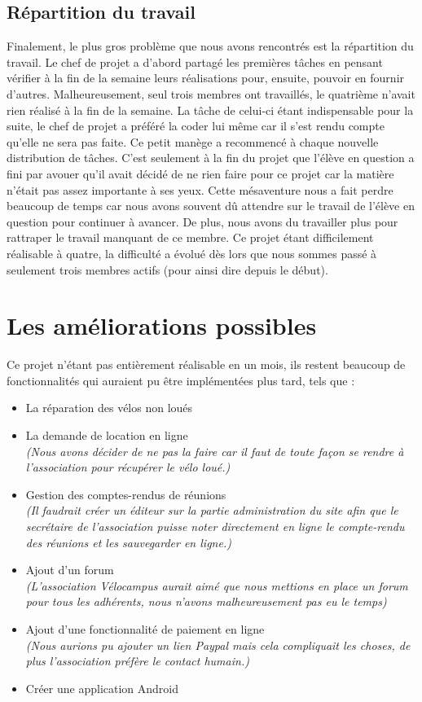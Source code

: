 \documentclass[11pt,a4paper,titlepage]{report}
\begin{document}
\section{Répartition du travail}
Finalement, le plus gros problème que nous avons rencontrés est la répartition du travail. 
Le chef de projet a d'abord partagé les premières tâches en pensant vérifier à la fin de la semaine leurs réalisations pour, ensuite, pouvoir en fournir d'autres. Malheureusement, seul trois membres ont travaillés, le quatrième n'avait rien réalisé à la fin de la semaine. 
La tâche de celui-ci étant indispensable pour la suite, le chef de projet a préféré la coder lui même car il s'est rendu compte qu'elle ne sera pas faite.
Ce petit manège a recommencé à chaque nouvelle distribution de tâches. C'est seulement à la fin du projet que l'élève en question a fini par avouer qu'il avait décidé de ne rien faire pour ce projet car la matière n'était pas assez importante à ses yeux. Cette mésaventure nous a fait perdre beaucoup de temps car nous avons souvent dû attendre sur le travail de l'élève en question pour continuer à avancer. De plus, nous avons du travailler plus pour rattraper le travail manquant de ce membre.
Ce projet étant difficilement réalisable à quatre, la difficulté a évolué dès lors que nous sommes passé à seulement trois membres actifs (pour ainsi dire depuis le début). 
\chapter{Les améliorations possibles}
Ce projet n'étant pas entièrement réalisable en un mois, ils restent beaucoup de fonctionnalités qui auraient pu être implémentées plus tard, tels que : \\
\begin{itemize}
\item La réparation des vélos non loués 
\item La demande de location en ligne \\
\textit{(Nous avons décider de ne pas la faire car il faut de toute façon se rendre à l'association pour récupérer le vélo loué.)}
\item Gestion des comptes-rendus de réunions\\ \textit{(Il faudrait créer un éditeur sur la partie administration du site afin que le secrétaire de l'association puisse noter directement en ligne le compte-rendu des réunions et les sauvegarder en ligne.)} 
\item Ajout d'un forum \\
\textit{(L'association Vélocampus aurait aimé que nous mettions en place un forum pour tous les adhérents, nous n'avons malheureusement pas eu le temps)} 
\item Ajout d'une fonctionnalité de paiement en ligne \\
\textit{(Nous aurions pu ajouter un lien Paypal mais cela compliquait les choses, de plus l'association préfère le contact humain.)} 
\item Créer une application Android
\end{itemize}
\end{document}
